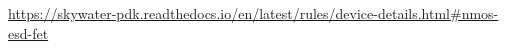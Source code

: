 	\url{https://skywater-pdk.readthedocs.io/en/latest/rules/device-details.html#nmos-esd-fet}
	
	
	
	
	
	
	
	
	
	
	
	
	
	
	
	
	
	
	
	
	
	
	